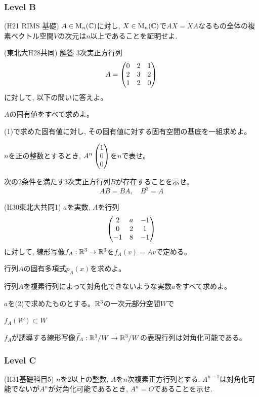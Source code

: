 \subsubsection{Level B}

\begin{prob} (H21 RIMS 基礎)
$A\in \mathrm{M}_{n}(\mathbb{C})$に対し, $X\in \mathrm{M}_n(\mathbb{C})$で$AX=XA$なるもの全体の複素ベクトル空間$V$の次元は$n$以上であることを証明せよ.
\end{prob}


\begin{prob} (東北大H28共同) \href{https://drive.google.com/file/d/1anaTAHLXhDH8Ng_6pvw6pPFb4MDD5v7i/view?usp=sharing}{解答}
$3$次実正方行列
\[
A = \begin{pmatrix} 0 & 2 & 1\\ 2 & 3 & 2 \\ 1 & 2 & 0 \end{pmatrix}
\]
に対して, 以下の問いに答えよ。
\ben
\item $A$の固有値をすべて求めよ。
\item (1)で求めた固有値に対し, その固有値に対する固有空間の基底を一組求めよ。
\item $n$を正の整数とするとき, $A^{n} \begin{pmatrix} 1\\ 0 \\ 0 \end{pmatrix}$を$n$で表せ。
\item 次の2条件を満たす$3$次実正方行列$B$が存在することを示せ。
\[AB=BA,\quad B^2 = A\]
\een
\end{prob}

\begin{prob} (H30東北大共同1)\label{prob:tohoku_H30_kyodo1}
$a$を実数, $A$を行列
\[\begin{pmatrix}
2 & a & -1\\
0 & 2 & 1\\
-1 & 8 & -1
\end{pmatrix}\]
に対して, 線形写像$f_{A}:\mathbb{R}^{3}\to\mathbb{R}^{3}$を$f_A(v)=Av$で定める。
\ben
\item 行列$A$の固有多項式$p_{A}(x)$を求めよ。
\item 行列$A$を複素行列によって対角化できないような実数$a$をすべて求めよ。
\item $a$を(2)で求めたものとする。$\mathbb{R}^{3}$の一次元部分空間$W$で
\ben[label=(\alph*)]
\item $f_{A}(W)  \subset  W$
\item $f_A$が誘導する線形写像$\widetilde{f}_{A}:\mathbb{R}^{3}/W\to \mathbb{R}^{3}/W$の表現行列は対角化可能である。
\een
\een
\end{prob}



\subsubsection{Level C}
\begin{prob} (H31基礎科目5) \label{prob:H31kiso5}
$n$を2以上の整数, $A$を$n$次複素正方行列とする. $A^{n-1}$は対角化可能でないが$A^n$が対角化可能であるとき, $A^n=O$であることを示せ.
\end{prob}



